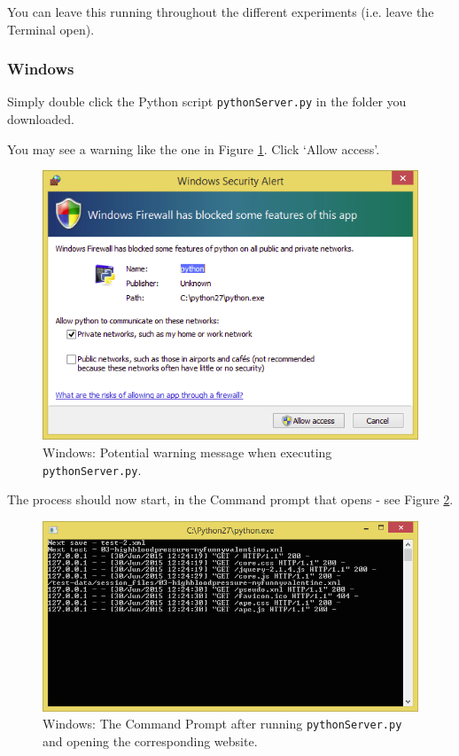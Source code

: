 \documentclass[11pt, oneside]{article}   	%
\begin{document}
			You can leave this running throughout the different experiments (i.e. leave the Terminal open). 

		\subsubsection{Windows}
		
			Simply double click the Python script \texttt{pythonServer.py} in the folder you downloaded. 
			
			You may see a warning like the one in Figure \ref{fig:warning}. Click `Allow access'. 
			
			\begin{figure}[htbp]
	                \begin{center}
	                \includegraphics[width=.6\textwidth]{warning.png}
	                \caption{Windows: Potential warning message when executing \texttt{pythonServer.py}.}
	                \label{fig:warning}
	                \end{center}
	                \end{figure}
	                
	                The process should now start, in the Command prompt that opens - see Figure \ref{fig:python}. 
	                
	                \begin{figure}[htbp]
	                \begin{center}
	                \includegraphics[width=.75\textwidth]{python.png}
	                \caption{Windows: The Command Prompt after running \texttt{pythonServer.py} and opening the corresponding website.}
	                \label{fig:python}
	                \end{center}
	                \end{figure}
	                
\end{document}
